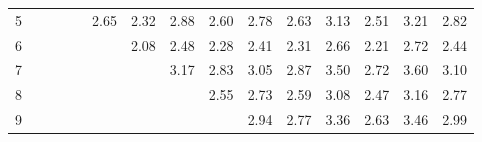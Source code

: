 \documentclass[a3paper,extrafontsizes,20pt, ngerman]{memoir}
\begin{document}
\begin{figure}
\begin{tabular}{c|cccccccccccccc}
        5                    &                                  &                                  &                                  &                                  & \textcolor[HTML]{ 83207b }{2.65} & \textcolor[HTML]{ 692095 }{2.32} & \textcolor[HTML]{ 952069 }{2.88} & \textcolor[HTML]{ 7f207f }{2.60} & \textcolor[HTML]{ 8d2071 }{2.78} & \textcolor[HTML]{ 82207c }{2.63} & \textcolor[HTML]{ aa2054 }{3.13} & \textcolor[HTML]{ 782086 }{2.51} & \textcolor[HTML]{ b0204e }{3.21} & \textcolor[HTML]{ 90206e }{2.82} \\
        6                    &                                  &                                  &                                  &                                  &                                  & \textcolor[HTML]{ 5620a8 }{2.08} & \textcolor[HTML]{ 762088 }{2.48} & \textcolor[HTML]{ 662098 }{2.28} & \textcolor[HTML]{ 70208e }{2.41} & \textcolor[HTML]{ 682096 }{2.31} & \textcolor[HTML]{ 84207a }{2.66} & \textcolor[HTML]{ 60209e }{2.21} & \textcolor[HTML]{ 882076 }{2.72} & \textcolor[HTML]{ 72208c }{2.44} \\
        7                    &                                  &                                  &                                  &                                  &                                  &                                  & \textcolor[HTML]{ ad2051 }{3.17} & \textcolor[HTML]{ 91206d }{2.83} & \textcolor[HTML]{ a3205b }{3.05} & \textcolor[HTML]{ 952069 }{2.87} & \textcolor[HTML]{ c72037 }{3.50} & \textcolor[HTML]{ 892075 }{2.72} & \textcolor[HTML]{ cf202f }{3.60} & \textcolor[HTML]{ a72057 }{3.10} \\
        8                    &                                  &                                  &                                  &                                  &                                  &                                  &                                  & \textcolor[HTML]{ 7b2083 }{2.55} & \textcolor[HTML]{ 892075 }{2.73} & \textcolor[HTML]{ 7e2080 }{2.59} & \textcolor[HTML]{ a52059 }{3.08} & \textcolor[HTML]{ 752089 }{2.47} & \textcolor[HTML]{ ac2052 }{3.16} & \textcolor[HTML]{ 8d2071 }{2.77} \\
        9                    &                                  &                                  &                                  &                                  &                                  &                                  &                                  &                                  & \textcolor[HTML]{ 9a2064 }{2.94} & \textcolor[HTML]{ 8d2071 }{2.77} & \textcolor[HTML]{ bc2042 }{3.36} & \textcolor[HTML]{ 82207c }{2.63} & \textcolor[HTML]{ c3203b }{3.46} & \textcolor[HTML]{ 9e2060 }{2.99} \\

\end{tabular}
\end{figure}
\end{document}
